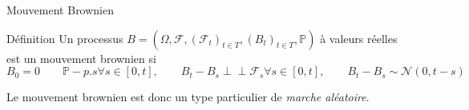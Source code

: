 \documentclass{beamer}
\newcommand{\1}{\mathmybb{1}}
\newcommand{\indep}{\perp \!\!\! \perp}
\begin{document}
\begin{frame}{Mouvement Brownien}
  \begin{block}{Définition}
    Un processus $ B = (\varOmega, \mathcal{F}, \left(  \mathcal{F}_{t} \right)_{t\in T},\left(  B_{t} \right)_{t\in T}, \mathbb{P} ) $ à valeurs réelles est un mouvement brownien si
    \begin{subequations}
      \begin{equation} B_{0} = 0 \qquad \mathbb{P}-p.s \end{equation}
      \begin{equation} \forall s \in \left[0, t\right], \qquad B_{t} - B_{s} \indep \mathcal{F}_{s} \end{equation}
      \begin{equation} \forall s \in \left[0, t\right], \qquad B_{t} - B_{s} \sim \mathcal{N} \left( 0, t-s\right)\end{equation}
      \end{subequations}
    \end{block}
    Le mouvement brownien est donc un type particulier de {\em marche aléatoire}.
\end{frame}
\end{document}
